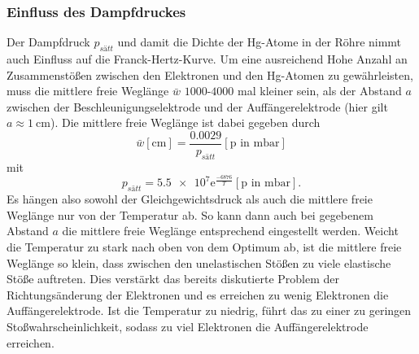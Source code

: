 \subsubsection*{Einfluss des Dampfdruckes}
Der Dampfdruck $p_{sätt}$ und damit die Dichte der Hg-Atome in der Röhre nimmt auch Einfluss auf die Franck-Hertz-Kurve. Um eine ausreichend
Hohe Anzahl an Zusammenstößen zwischen den Elektronen und den Hg-Atomen zu gewährleisten, muss die mittlere freie Weglänge $\bar{w}$ 
$\num{1000}$-$\num{4000}$ mal kleiner sein, als der Abstand $a$ zwischen der Beschleunigungselektrode und der Auffängerelektrode (hier gilt 
$a\approx\SI{1}{\centi\metre}$). Die mittlere freie Weglänge ist dabei gegeben durch 
\begin{equation*}
    \bar{w}[\si{\centi\metre}]=\frac{\num{0.0029}}{p_{sätt}} [\text{p in } \si{\milli\bar}]
\end{equation*}
mit 
\begin{equation*}
    p_{sätt}=\num{5.5e7}\text{e}^{\frac{-6876}{T}} [\text{p in }\si{\milli\bar}] .
\end{equation*}
Es hängen also sowohl der Gleichgewichtsdruck als auch die mittlere freie Weglänge nur von der Temperatur ab. So kann dann auch bei gegebenem
Abstand $a$ die mittlere freie Weglänge entsprechend eingestellt werden. Weicht die Temperatur zu stark nach oben von dem Optimum ab, ist die 
mittlere freie Weglänge so klein, dass zwischen den unelastischen Stößen zu viele elastische Stöße auftreten. Dies verstärkt das bereits 
diskutierte Problem der Richtungsänderung der Elektronen und es erreichen zu wenig Elektronen die Auffängerelektrode. Ist die Temperatur zu 
niedrig, führt das zu einer zu geringen Stoßwahrscheinlichkeit, sodass zu viel Elektronen die Auffängerelektrode erreichen. 